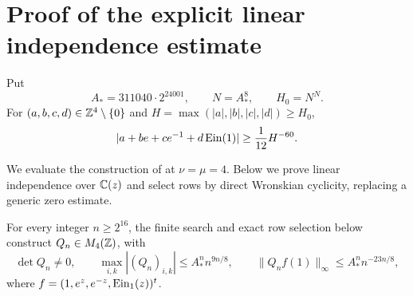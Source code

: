 \section{Proof of the explicit linear independence estimate}\label{sec:measure}

\begin{explicitestimate}\label{thm:measure}
Put
\begin{equation}\label{m4:constants}
 A_*=311040\cdot2^{24001},\qquad N=A_*^8,\qquad H_0=N^N.
\end{equation}
For $(a,b,c,d)\in\mathbb{Z}^4\setminus\{0\}$ and
$H=\max(|a|,|b|,|c|,|d|)\ge H_0$,
\begin{equation}\label{m4:measure}
 |a+be+ce^{-1}+d\operatorname{Ein}(1)|\ge\frac1{12}H^{-60}.
\end{equation}
\end{explicitestimate}

We evaluate the construction of
\cite[Proposition~3.1 and Lemma~3.2, pp.~12--15]{AdamczewskiFaverjon2026}
at $\nu=\mu=4$. Below we prove linear independence over $\mathbb{C}(z)$
and select rows by direct Wronskian cyclicity, replacing a generic zero estimate.

\begin{lemma}\label{m4:matrix}
For every integer $n\ge2^{16}$, the finite search and exact row selection below construct
$Q_n\in M_4(\mathbb{Z})$, with
\begin{equation}\label{m4:matrix-bounds}
 \det Q_n\ne0,\qquad
 \max_{i,k}|(Q_n)_{i,k}|\le A_*^nn^{9n/8},\qquad
 \|Q_nf(1)\|_\infty\le A_*^nn^{-23n/8},
\end{equation}
where $f=(1,e^z,e^{-z},\operatorname{Ein}_1(z))^t$.
\end{lemma}

